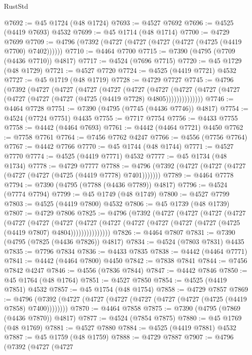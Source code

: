 \begin{lexlean}{RustStd}
\begin{coremodule}
@7692 := @45 @1724 (@48 @1724)
@7693 := @4527 @7692
@7696 := @4525 (@4419 @7693) @4532
@7699 := @45 @1714 (@48 @1714)
@7700 := @4729 @7699
@7709 := @4796 (@7392 (@4727 (@4727 (@4727 (@4727 (@4725 (@4419 @7700) @7402))))))
@7710 := @4464 @7700
@7715 := @7390 (@4795 (@7709 (@4436 @7710)) @4817)
@7717 := @4524 (@7696 @7715)
@7720 := @45 @1729 (@48 @1729)
@7721 := @4527 @7720
@7724 := @4525 (@4419 @7721) @4532
@7727 := @45 @1719 (@48 @1719)
@7728 := @4729 @7727
@7745 := @4796
    (@7392
      (@4727
        (@4727
          (@4727
            (@4727
              (@4727
                (@4727
                  (@4727 (@4727 (@4727 (@4727 (@4727 (@4727 (@4725 (@4419 @7728) @4805))))))))))))))
@7746 := @4464 @7728
@7751 := @7390 (@4795 (@7745 (@4436 @7746)) @4817)
@7754 := @4524 (@7724 @7751) @4435
@7755 := @7717 @7754
@7756 := @4433 @7755
@7758 := @4442 (@4464 @7693)
@7761 := @4442 (@4464 @7721) @4450
@7762 := @7758 @7761
@7764 := @7456 @7762 @4247
@7766 := @4556 (@7756 @7764)
@7767 := @4442 @7766
@7770 := @45 @1744 (@48 @1744)
@7771 := @4527 @7770
@7774 := @4525 (@4419 @7771) @4532
@7777 := @45 @1734 (@48 @1734)
@7778 := @4729 @7777
@7788 := @4796 (@7392 (@4727 (@4727 (@4727 (@4727 (@4727 (@4725 (@4419 @7778) @7401)))))))
@7789 := @4464 @7778
@7794 := @7390 (@4795 (@7788 (@4436 @7789)) @4817)
@7796 := @4524 (@7774 @7794)
@7799 := @45 @1749 (@48 @1749)
@7800 := @4527 @7799
@7803 := @4525 (@4419 @7800) @4532
@7806 := @45 @1739 (@48 @1739)
@7807 := @4729 @7806
@7825 := @4796
    (@7392
      (@4727
        (@4727
          (@4727
            (@4727
              (@4727
                (@4727
                  (@4727
                    (@4727
                      (@4727 (@4727 (@4727 (@4727 (@4727 (@4725 (@4419 @7807) @4804)))))))))))))))
@7826 := @4464 @7807
@7831 := @7390 (@4795 (@7825 (@4436 @7826)) @4817)
@7834 := @4524 (@7803 @7831) @4435
@7835 := @7796 @7834
@7836 := @4433 @7835
@7838 := @4442 (@4464 @7771)
@7841 := @4442 (@4464 @7800) @4450
@7842 := @7838 @7841
@7844 := @7456 @7842 @4247
@7846 := @4556 (@7836 @7844)
@7847 := @4442 @7846
@7850 := @45 @1764 (@48 @1764)
@7851 := @4527 @7850
@7854 := @4525 (@4419 @7851) @4532
@7857 := @45 @1754 (@48 @1754)
@7858 := @4729 @7857
@7869 := @4796 (@7392 (@4727 (@4727 (@4727 (@4727 (@4727 (@4727 (@4725 (@4419 @7858) @7400))))))))
@7870 := @4464 @7858
@7875 := @7390 (@4795 (@7869 (@4436 @7870)) @4817)
@7877 := @4524 (@7854 @7875)
@7880 := @45 @1769 (@48 @1769)
@7881 := @4527 @7880
@7884 := @4525 (@4419 @7881) @4532
@7887 := @45 @1759 (@48 @1759)
@7888 := @4729 @7887
@7907 := @4796
    (@7392
      (@4727
        (@4727

\end{coremodule}
\end{lexlean}
